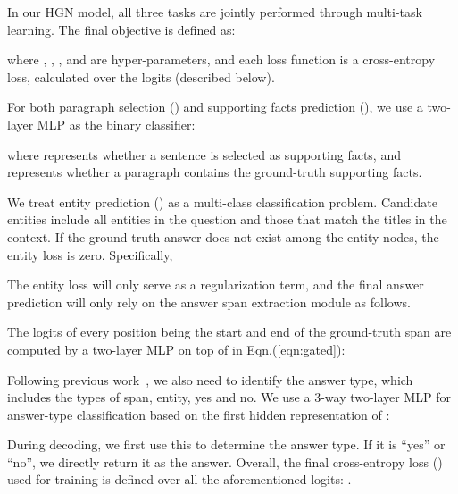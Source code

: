 \documentclass[11pt,a4paper]{article}
\begin{document}
In our HGN model, all three tasks are jointly performed through multi-task learning. The final objective is defined as:

where , , , and  are hyper-parameters, and each loss function is a cross-entropy loss, calculated over the logits (described below).


For both paragraph selection () and supporting facts prediction (), we use a two-layer MLP as the binary classifier:

where  
represents whether a sentence is selected as supporting facts, and  represents whether a paragraph contains the ground-truth supporting facts. 

We treat entity prediction () as a multi-class classification problem. Candidate entities include all entities in the question and those that match the titles in the context. If the ground-truth answer does not exist among the entity nodes, the entity loss is zero. Specifically,

The entity loss will only serve as a regularization term, and the final answer prediction will only rely on the answer span extraction module as follows. 


The logits of every position being the start and end of the ground-truth span are computed by  a two-layer MLP on top of  in Eqn.(\ref{eqn:gated}):

Following previous work~\cite{DFGN}, we also need to identify the answer type, which includes the types of span, entity, yes and no.
We use a 3-way two-layer MLP for answer-type classification based on the first hidden representation of :

During decoding, we first use this to determine the answer type. If it is ``yes'' or ``no'', we directly return it as the answer. 
Overall, the final cross-entropy loss () used for training is defined over all the aforementioned logits: . 
\end{document}
